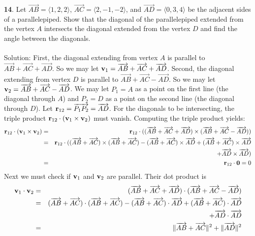 \documentclass[12pt]{amsbook}
\newcommand{\la}{\langle}
\newcommand{\ra}{\rangle}
\begin{document}
{\small\bf 14}. Let $\overrightarrow{AB}=\la 1,2,2\ra$, 
$\overrightarrow{AC}=\la 2,-1,-2\ra$, and $\overrightarrow{AD}=\la 0,3,4\ra$ be the adjacent sides
of a parallelepiped. Show that the diagonal of the parallelepiped
extended from the vertex $A$ intersects the diagonal extended from 
the vertex $D$ and find the angle between the diagonals.
\\
\\
{\sc Solution}: First, the diagonal extending from vertex $A$ is parallel to $\overrightarrow{AB}+\overrightarrow{AC}+\overrightarrow{AD}$. So we may let ${\bf v}_1=\overrightarrow{AB}+\overrightarrow{AC}+\overrightarrow{AD}$. Second, the diagonal extending from vertex $D$ is parallel to $\overrightarrow{AB}+\overrightarrow{AC}-\overrightarrow{AD}$. So we may let ${\bf v}_2=\overrightarrow{AB}+\overrightarrow{AC}-\overrightarrow{AD}$. We may let $P_1=A$ as a point on the first line (the diagonal through $A$) and $P_2=D$ as a point on the second line (the diagonal through $D$). Let ${\bf r}_{12}=\overrightarrow{P_1P_2}=\overrightarrow{AD}$. For the diagonals to be intersecting, the triple product ${\bf r}_{12}\cdot({\bf v}_1\times{\bf v}_2)$ must vanish. Computing the triple product yields:
\begin{eqnarray*}
{\bf r}_{12}\cdot({\bf v}_1\times{\bf v}_2)&=&{\bf r}_{12}\cdot((\overrightarrow{AB}+\overrightarrow{AC}+\overrightarrow{AD})\times(\overrightarrow{AB}+\overrightarrow{AC}-\overrightarrow{AD}))\\
&=&{\bf r}_{12}\cdot((\overrightarrow{AB}+\overrightarrow{AC})\times(\overrightarrow{AB}+\overrightarrow{AC})-(\overrightarrow{AB}+\overrightarrow{AC})\times\overrightarrow{AD}+(\overrightarrow{AB}+\overrightarrow{AC})\times\overrightarrow{AD}\\
&& \ \ \ \ \ +\overrightarrow{AD}\times\overrightarrow{AD})\\
&=&{\bf r}_{12}\cdot{\bf 0}=0
\end{eqnarray*}
Next we must check if ${\bf v}_1$ and ${\bf v}_2$ are parallel. Their dot product is
\begin{eqnarray*}
{\bf v}_1\cdot{\bf v}_2&=&(\overrightarrow{AB}+\overrightarrow{AC}+\overrightarrow{AD})\cdot(\overrightarrow{AB}+\overrightarrow{AC}-\overrightarrow{AD})\\
&=&(\overrightarrow{AB}+\overrightarrow{AC})\cdot(\overrightarrow{AB}+\overrightarrow{AC})-(\overrightarrow{AB}+\overrightarrow{AC})\cdot\overrightarrow{AD}+(\overrightarrow{AB}+\overrightarrow{AC})\cdot\overrightarrow{AD}\\
&& \ \ \ \ \ +\overrightarrow{AD}\cdot\overrightarrow{AD}\\
&=&\|\overrightarrow{AB}+\overrightarrow{AC}\|^2+\|\overrightarrow{AD}\|^2
\end{eqnarray*}
\end{document}
